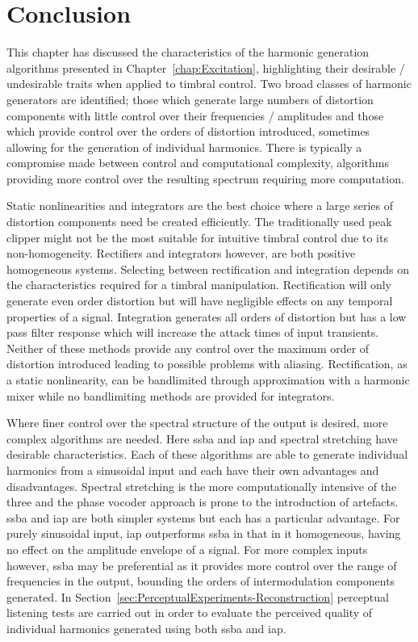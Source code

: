 \section{Conclusion}
	This chapter has discussed the characteristics of the harmonic generation algorithms presented in
	Chapter~\ref{chap:Excitation}, highlighting their desirable / undesirable traits when applied to timbral control.
	Two broad classes of harmonic generators are identified; those which generate large numbers of distortion
	components with little control over their frequencies / amplitudes and those which provide control over the orders
	of distortion introduced, sometimes allowing for the generation of individual harmonics. There is typically a
	compromise made between control and computational complexity, algorithms providing more control over the resulting
	spectrum requiring more computation.

	Static nonlinearities and integrators are the best choice where a large series of distortion components need be
	created efficiently. The traditionally used peak clipper might not be the most suitable for intuitive timbral
	control due to its non-homogeneity. Rectifiers and integrators however, are both positive homogeneous systems.
	Selecting between rectification and integration depends on the characteristics required for a timbral manipulation.
	Rectification will only generate even order distortion but will have negligible effects on any temporal properties
	of a signal. Integration generates all orders of distortion but has a low pass filter response which will increase
	the attack times of input transients. Neither of these methods provide any control over the maximum order of
	distortion introduced leading to possible problems with aliasing. Rectification, as a static nonlinearity, can be
	bandlimited through approximation with a harmonic mixer while no bandlimiting methods are provided for integrators.

	Where finer control over the spectral structure of the output is desired, more complex algorithms are needed. Here
	\acrshort{ssba} and \acrshort{iap} and spectral stretching have desirable characteristics. Each of these algorithms
	are able to generate individual harmonics from a sinusoidal input and each have their own advantages and
	disadvantages.  Spectral stretching is the more computationally intensive of the three and the phase vocoder
	approach is prone to the introduction of artefacts. \acrshort{ssba} and \acrshort{iap} are both simpler systems but
	each has a particular advantage. For purely sinusoidal input, \acrshort{iap} outperforms \acrshort{ssba} in that in
	it homogeneous, having no effect on the amplitude envelope of a signal. For more complex inputs however,
	\acrshort{ssba} may be preferential as it provides more control over the range of frequencies in the output,
	bounding the orders of intermodulation components generated.	In
	Section~\ref{sec:PerceptualExperiments-Reconstruction} perceptual listening tests are carried out in order to
	evaluate the perceived quality of individual harmonics generated using both \acrshort{ssba} and \acrshort{iap}.

